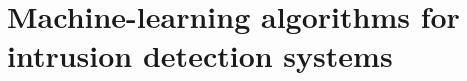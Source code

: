 \chapter{Machine-learning algorithms for intrusion detection systems}
\label{cha:2}





%


\FloatBarrier